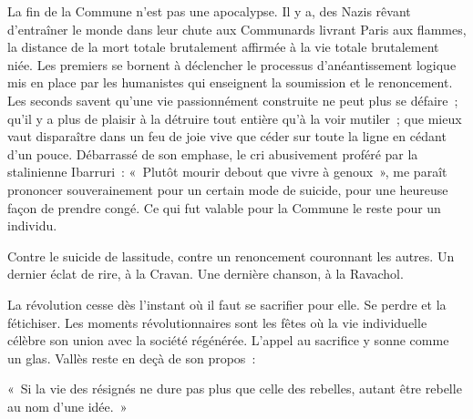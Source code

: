 \documentclass[french,twoside]{book} %
\newcommand{\astermono}{\medskip\centerline{\color{rubric}\large\selectfont{\syms ✻}}\medskip\par}%
\newenvironment{quoteblock}%
  {\begin{quoting}}
  {\end{quoting}}
\newenvironment{quotebar}{%
    \def\FrameCommand{{\color{rubric!10!}\vrule width 0.5em} \hspace{0.9em}}%
    \def\OuterFrameSep{\itemsep} %
    \MakeFramed {\advance\hsize-\width \FrameRestore}
  }%
  {%
    \endMakeFramed
  }
\renewenvironment{quoteblock}%
  {%
    \savenotes
    \setstretch{0.9}
    \normalfont
    \begin{quotebar}
  }
  {%
    \end{quotebar}
    \spewnotes
  }
\begin{document}
La fin de la Commune n’est pas une apocalypse. Il y a, des Nazis rêvant d’entraîner le monde dans leur chute aux Communards livrant Paris aux flammes, la distance de la mort totale brutalement affirmée à la vie totale brutalement niée. Les premiers se bornent à déclencher le processus d’anéantissement logique mis en place par les humanistes qui enseignent la soumission et le renoncement. Les seconds savent qu’une vie passionnément construite ne peut plus se défaire ; qu’il y a plus de plaisir à la détruire tout entière qu’à la voir mutiler ; que mieux vaut disparaître dans un feu de joie vive que céder sur toute la ligne en cédant d’un pouce. Débarrassé de son emphase, le cri abusivement proféré par la stalinienne Ibarruri : « Plutôt mourir debout que vivre à genoux », me paraît prononcer souverainement pour un certain mode de suicide, pour une heureuse façon de prendre congé. Ce qui fut valable pour la Commune le reste pour un individu.\par
Contre le suicide de lassitude, contre un renoncement couronnant les autres. Un dernier éclat de rire, à la Cravan. Une dernière chanson, à la Ravachol.\par

\astermono

\noindent La révolution cesse dès l’instant où il faut se sacrifier pour elle. Se perdre et la fétichiser. Les moments révolutionnaires sont les fêtes où la vie individuelle célèbre son union avec la société régénérée. L’appel au sacrifice y sonne comme un glas. Vallès reste en deçà de son propos :\par

\begin{quoteblock}
\noindent « Si la vie des résignés ne dure pas plus que celle des rebelles, autant être rebelle au nom d’une idée. »\end{quoteblock}
\end{document}

